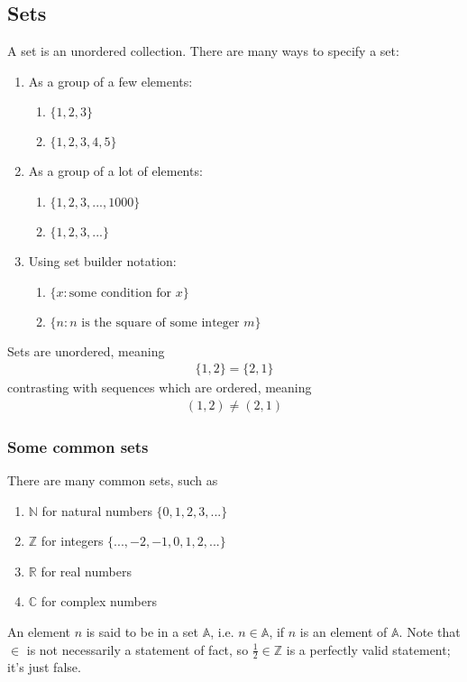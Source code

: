 \subsection{Sets}
\begin{definition}
    A set is an unordered collection. There are many ways to specify a set:
    \begin{enumerate}
        \item As a group of a few elements:
        \begin{enumerate}
            \item $\{ 1, 2, 3 \}$
            \item $\{ 1, 2, 3, 4, 5 \}$
        \end{enumerate}
        \item As a group of a lot of elements:
        \begin{enumerate}
            \item $\{ 1, 2, 3, ..., 1000 \}$
            \item $\{ 1, 2, 3, ... \}$
        \end{enumerate}
        \item Using set builder notation:
        \begin{enumerate}
            \item $\{ x : \text{some condition for $x$} \}$
            \item $\{ n : n \text{ is the square of some integer $m$} \}$
        \end{enumerate}
    \end{enumerate}
\end{definition}
Sets are unordered, meaning
\begin{align}
    \{ 1, 2 \} = \{ 2, 1 \}
\end{align}
contrasting with sequences which are ordered, meaning
\begin{align}
    (1, 2) \ne (2, 1)
\end{align}
\subsubsection{Some common sets}
There are many common sets, such as
\begin{enumerate}
    \item $\mathbb{N}$ for natural numbers $\{ 0, 1, 2, 3, ... \}$
    \item $\mathbb{Z}$ for integers $\{ ..., -2, -1, 0, 1, 2, ... \}$
    \item $\mathbb{R}$ for real numbers
    \item $\mathbb{C}$ for complex numbers
\end{enumerate}
An element $n$ is said to be in a set $\mathbb{A}$, i.e. $n \in \mathbb{A}$, if $n$ is an element of $\mathbb{A}$. Note that $\in$ is not necessarily a statement of fact, so $\frac{1}{2}\in \mathbb{Z}$ is a perfectly valid statement; it's just false.


